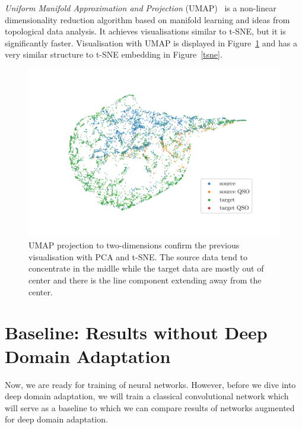 \textit{Uniform Manifold Approximation and Projection} (UMAP)~\cite{mcinnes2018}
is a non-linear dimensionality reduction algorithm based on manifold learning and ideas from topological data analysis.
It achieves visualisations similar to t-SNE, but it is significantly faster.
Visualisation with UMAP is displayed in Figure~\ref{umap}
and has a very similar structure to t-SNE embedding in Figure~\ref{tsne}.

\begin{figure}
\includegraphics[width=\textwidth]{img/umap.pdf}
\caption[UMAP visualisation of source and target data distributions]{
	UMAP projection to two-dimensions confirm the previous visualisation
	with PCA and t-SNE.
	The source data tend to concentrate in the midlle
	while the target data are mostly out of center
	and there is the line component extending away from the center.
	}
\label{umap}
\end{figure}

\section{Baseline: Results without Deep Domain Adaptation}
\label{baseline}

Now, we are ready for training of neural networks.
However, before we dive into deep domain adaptation,
we will train a classical convolutional network
which will serve as a baseline to which we can compare results of networks augmented for deep domain adaptation.

